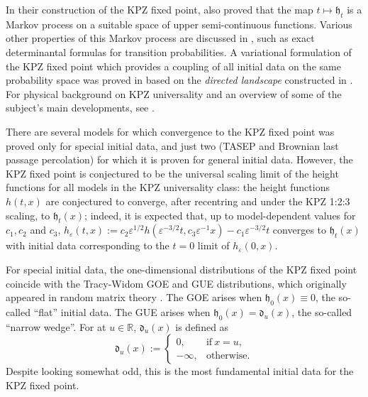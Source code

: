 \documentclass[oneside,final,11pt]{amsart}
\theoremstyle{definition}
\newcommand{\fh}{\mathfrak{h}}
\newcommand{\fd}{\mathfrak{d}}
\newcommand{\R}{\mathbb{R}}
\newcommand{\1}[1]{\mathbf{1}_{#1}}
\newcommand{\eps}{\varepsilon}
\newcommand{\by}{\mathbf{y}}
\numberwithin{equation}{section}
\begin{document}

In their construction of the KPZ fixed point, \cite{fixedpt}  also proved that the map $t \mapsto \fh_t$ is a Markov process on a suitable space of upper semi-continuous functions. Various other properties of this Markov process are discussed in \cite[Section~4]{fixedpt}, such as exact determinantal formulas for transition probabilities. A variational formulation of the KPZ fixed point which provides a coupling of all initial data on the same probability space was proved in \cite{NQR20} based on the {\em directed landscape} constructed in \cite{Landscape}. For physical background on KPZ universality and an overview of some of the subject's main developments, see \cite{Takeuchi, quastelCDM, corwinReview, borodinPetrov, quastelSpohn}.


There are several models for which convergence to the KPZ fixed point was proved only for special initial data, and just two (TASEP and Brownian last passage percolation) for which it is proven for general initial data. However, the KPZ fixed point is conjectured to be the universal scaling limit of the height functions for all models in the KPZ universality class: the height functions $h(t,x)$ are conjectured to converge, after recentring and under the KPZ 1:2:3 scaling, to $\fh_t(x)$; indeed, it is expected that, up to model-dependent values for $c_1,c_2$ and $c_3$,  $h_{\eps}(t,x):=c_2\eps^{1/2} h(\eps^{-3/2} t, c_3\eps^{-1} x) - c_1 \eps^{-3/2} t$ converges to $\fh_t(x)$ with initial data corresponding to the $t=0$ limit of $h_{\eps}(0,x)$.

For special initial data, the one-dimensional distributions of the KPZ fixed point coincide with the Tracy-Widom GOE and GUE distributions, which originally appeared in random matrix theory \cite{tracyWidom, tracyWidom2, RM}. The GOE arises when $\fh_0(x)\equiv 0$, the so-called ``flat'' initial data. The GUE arises when $\fh_0(x)=\fd_u(x)$, the so-called ``narrow wedge''. For at $u \in \R$, $\fd_u(x)$ is defined as
\begin{equation}\label{eq:NW}
\fd_u(x) :=
\begin{cases}
0, &\text{if}~ x = u,\\
-\infty, &\text{otherwise}.
\end{cases}
\end{equation}
Despite looking somewhat odd, this is the most fundamental initial data for the KPZ fixed point.
\end{document}

